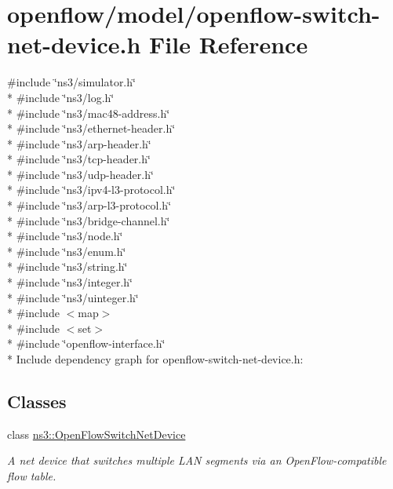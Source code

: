 \hypertarget{openflow-switch-net-device_8h}{}\section{openflow/model/openflow-\/switch-\/net-\/device.h File Reference}
\label{openflow-switch-net-device_8h}
{\ttfamily \#include \char`\"{}ns3/simulator.\+h\char`\"{}}\\*
{\ttfamily \#include \char`\"{}ns3/log.\+h\char`\"{}}\\*
{\ttfamily \#include \char`\"{}ns3/mac48-\/address.\+h\char`\"{}}\\*
{\ttfamily \#include \char`\"{}ns3/ethernet-\/header.\+h\char`\"{}}\\*
{\ttfamily \#include \char`\"{}ns3/arp-\/header.\+h\char`\"{}}\\*
{\ttfamily \#include \char`\"{}ns3/tcp-\/header.\+h\char`\"{}}\\*
{\ttfamily \#include \char`\"{}ns3/udp-\/header.\+h\char`\"{}}\\*
{\ttfamily \#include \char`\"{}ns3/ipv4-\/l3-\/protocol.\+h\char`\"{}}\\*
{\ttfamily \#include \char`\"{}ns3/arp-\/l3-\/protocol.\+h\char`\"{}}\\*
{\ttfamily \#include \char`\"{}ns3/bridge-\/channel.\+h\char`\"{}}\\*
{\ttfamily \#include \char`\"{}ns3/node.\+h\char`\"{}}\\*
{\ttfamily \#include \char`\"{}ns3/enum.\+h\char`\"{}}\\*
{\ttfamily \#include \char`\"{}ns3/string.\+h\char`\"{}}\\*
{\ttfamily \#include \char`\"{}ns3/integer.\+h\char`\"{}}\\*
{\ttfamily \#include \char`\"{}ns3/uinteger.\+h\char`\"{}}\\*
{\ttfamily \#include $<$map$>$}\\*
{\ttfamily \#include $<$set$>$}\\*
{\ttfamily \#include \char`\"{}openflow-\/interface.\+h\char`\"{}}\\*
Include dependency graph for openflow-\/switch-\/net-\/device.h\+:
\subsection*{Classes}
\begin{DoxyCompactItemize}
\item 
class \hyperlink{classns3_1_1OpenFlowSwitchNetDevice}{ns3\+::\+Open\+Flow\+Switch\+Net\+Device}
\begin{DoxyCompactList}\small\item\em A net device that switches multiple L\+AN segments via an Open\+Flow-\/compatible flow table. \end{DoxyCompactList}\end{DoxyCompactItemize}
